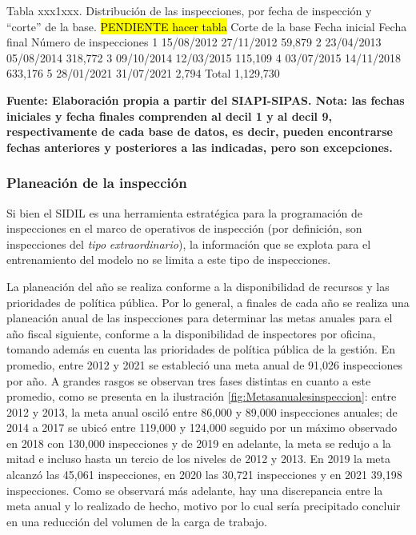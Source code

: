 \documentclass[
]{article}
\begin{document}
Tabla xxx1xxx. Distribución de las inspecciones, por fecha de inspección y ``corte'' de la base.
\hl{PENDIENTE hacer tabla}
Corte de la base Fecha inicial Fecha final Número de inspecciones
1 15/08/2012 27/11/2012 59,879
2 23/04/2013 05/08/2014 318,772
3 09/10/2014 12/03/2015 115,109
4 03/07/2015 14/11/2018 633,176
5 28/01/2021 31/07/2021 2,794
Total 1,129,730

\textbf{Fuente: Elaboración propia a partir del SIAPI-SIPAS. Nota: las fechas iniciales y fecha finales comprenden al decil 1 y al decil 9, respectivamente de cada base de datos, es decir, pueden encontrarse fechas anteriores y posteriores a las indicadas, pero son excepciones. }

\hypertarget{planeaciuxf3n-de-la-inspecciuxf3n}{%
\subsubsection{Planeación de la inspección}\label{planeaciuxf3n-de-la-inspecciuxf3n}}

Si bien el SIDIL es una herramienta estratégica para la programación de inspecciones en el marco de operativos de inspección (por definición, son inspecciones del \emph{tipo} \emph{extraordinario}), la información que se explota para el entrenamiento del modelo no se limita a este tipo de inspecciones.

La planeación del año se realiza conforme a la disponibilidad de recursos y las prioridades de política pública. Por lo general, a finales de cada año se realiza una planeación anual de las inspecciones para determinar las metas anuales para el año fiscal siguiente, conforme a la disponibilidad de inspectores por oficina, tomando además en cuenta las prioridades de política pública de la gestión. En promedio, entre 2012 y 2021 se estableció una meta anual de 91,026 inspecciones por año. A grandes rasgos se observan tres fases distintas en cuanto a este promedio, como se presenta en la ilustración \ref{fig:Metasanualesinspeccion}: entre 2012 y 2013, la meta anual osciló entre 86,000 y 89,000 inspecciones anuales; de 2014 a 2017 se ubicó entre 119,000 y 124,000 seguido por un máximo observado en 2018 con 130,000 inspecciones y de 2019 en adelante, la meta se redujo a la mitad e incluso hasta un tercio de los niveles de 2012 y 2013. En 2019 la meta alcanzó las 45,061 inspecciones, en 2020 las 30,721 inspecciones y en 2021 39,198 inspecciones. Como se observará más adelante, hay una discrepancia entre la meta anual y lo realizado de hecho, motivo por lo cual sería precipitado concluir en una reducción del volumen de la carga de trabajo.
\end{document}
